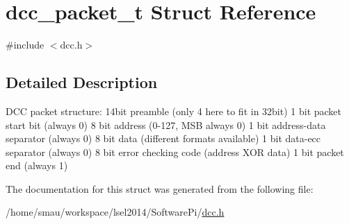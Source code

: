 \hypertarget{structdcc__packet__t}{\section{dcc\-\_\-packet\-\_\-t Struct Reference}
\label{structdcc__packet__t}
}


{\ttfamily \#include $<$dcc.\-h$>$}



\subsection{Detailed Description}
D\-C\-C packet structure\-: 14bit preamble (only 4 here to fit in 32bit) 1 bit packet start bit (always 0) 8 bit address (0-\/127, M\-S\-B always 0) 1 bit address-\/data separator (always 0) 8 bit data (different formats available) 1 bit data-\/ecc separator (always 0) 8 bit error checking code (address X\-O\-R data) 1 bit packet end (always 1) 

The documentation for this struct was generated from the following file\-:\begin{DoxyCompactItemize}
\item 
/home/smau/workspace/lsel2014/\-Software\-Pi/\hyperlink{dcc_8h}{dcc.\-h}\end{DoxyCompactItemize}
